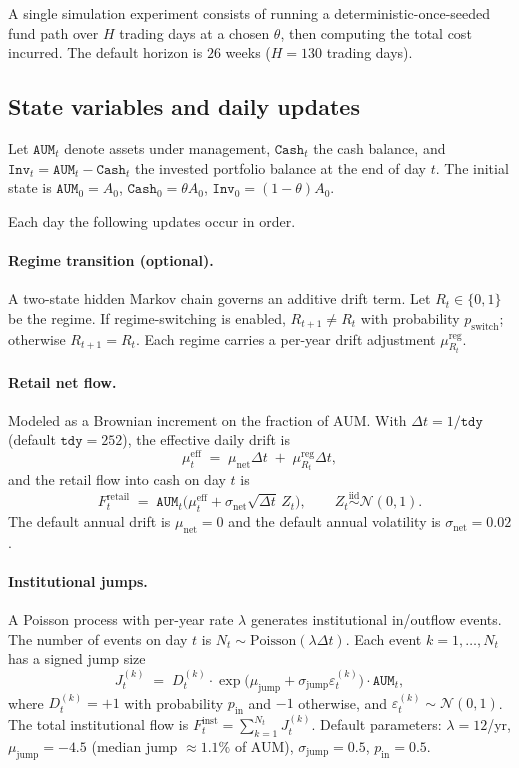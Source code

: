 \documentclass[11pt]{article}
\newcommand{\Normal}{\mathcal{N}}
\newcommand{\Cstar}{\theta}
\newcommand{\code}[1]{\texttt{#1}}
\begin{document}
A single simulation experiment consists of running a deterministic-once-seeded
fund path over $H$ trading days at a chosen $\Cstar$, then computing the total
cost incurred. The default horizon is $26$ weeks ($H = 130$ trading days).

\subsection{State variables and daily updates}
\label{sec:sim:dynamics}

Let $\code{AUM}_t$ denote assets under management, $\code{Cash}_t$ the cash
balance, and $\code{Inv}_t = \code{AUM}_t - \code{Cash}_t$ the invested
portfolio balance at the end of day $t$. The initial state is $\code{AUM}_0
= A_0$, $\code{Cash}_0 = \Cstar A_0$, $\code{Inv}_0 = (1-\Cstar) A_0$.

Each day the following updates occur in order.

\paragraph{Regime transition (optional).} A two-state hidden Markov chain
governs an additive drift term. Let $R_t \in \{0,1\}$ be the regime. If
regime-switching is enabled, $R_{t+1} \neq R_t$ with probability
$p_{\mathrm{switch}}$; otherwise $R_{t+1} = R_t$. Each regime carries a
per-year drift adjustment $\mu^{\mathrm{reg}}_{R_t}$.

\paragraph{Retail net flow.} Modeled as a Brownian increment on the
fraction of AUM. With $\Delta t = 1/\code{tdy}$ (default $\code{tdy}=252$),
the effective daily drift is
\[
  \mu^{\mathrm{eff}}_t \;=\; \mu_{\mathrm{net}} \Delta t \;+\; \mu^{\mathrm{reg}}_{R_t} \Delta t,
\]
and the retail flow into cash on day $t$ is
\[
  F^{\mathrm{retail}}_t \;=\; \code{AUM}_t \bigl(\mu^{\mathrm{eff}}_t + \sigma_{\mathrm{net}} \sqrt{\Delta t}\, Z_t\bigr),
  \qquad Z_t \stackrel{\text{iid}}{\sim} \Normal(0,1).
\]
The default annual drift is $\mu_{\mathrm{net}} = 0$ and the default annual
volatility is $\sigma_{\mathrm{net}} = 0.02$.

\paragraph{Institutional jumps.} A Poisson process with per-year rate
$\lambda$ generates institutional in/outflow events. The number of events on
day $t$ is $N_t \sim \mathrm{Poisson}(\lambda \Delta t)$. Each event $k =
1, \dots, N_t$ has a signed jump size
\[
  J^{(k)}_t \;=\; D^{(k)}_t \cdot \exp\!\bigl(\mu_{\mathrm{jump}} + \sigma_{\mathrm{jump}} \varepsilon^{(k)}_t\bigr) \cdot \code{AUM}_t,
\]
where $D^{(k)}_t = +1$ with probability $p_{\mathrm{in}}$ and $-1$ otherwise,
and $\varepsilon^{(k)}_t \sim \Normal(0,1)$. The total institutional flow is
$F^{\mathrm{inst}}_t = \sum_{k=1}^{N_t} J^{(k)}_t$. Default parameters:
$\lambda = 12$/yr, $\mu_{\mathrm{jump}} = -4.5$ (median jump $\approx 1.1\%$
of AUM), $\sigma_{\mathrm{jump}} = 0.5$, $p_{\mathrm{in}} = 0.5$.
\end{document}
